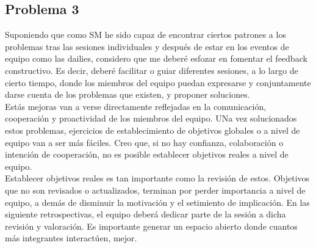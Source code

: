 \documentclass[a4paper, 11pt, oneside]{article}
\begin{document}
\subsection{Problema 3}
Suponiendo que como SM he sido capaz de encontrar ciertos patrones a los
problemas tras las sesiones individuales y después de estar en los eventos de
equipo como las dailies, considero que me deberé esfozar en fomentar el feedback
constructivo. Es decir, deberé facilitar o guiar diferentes sesiones, a lo largo
de cierto tiempo, donde los miembros del equipo puedan expresarse y
conjuntamente darse cuenta de los problemas que existen, y proponer soluciones.
\\
Estás mejoras van a verse directamente reflejadas en la comunicación,
cooperación y proactividad de los miembros del equipo. UNa vez solucionados
estos problemas, ejercicios de establecimiento de objetivos globales o a nivel
de equipo van a ser más fáciles. Creo que, si no hay confianza, colaboración o
intención de cooperación, no es posible establecer objetivos reales a nivel de
equipo.
\\
Establecer objetivos reales es tan importante como la revisión de estos.
Objetivos que no son revisados o actualizados, terminan por perder importancia a
nivel de equipo, a demás de disminuir la motivación y el setimiento de
implicación. En las siguiente retrospectivas, el equipo deberá dedicar parte de
la sesión a dicha revisión y valoración. Es importante generar un espacio
abierto donde cuantos más integrantes interactúen, mejor.
\end{document}
